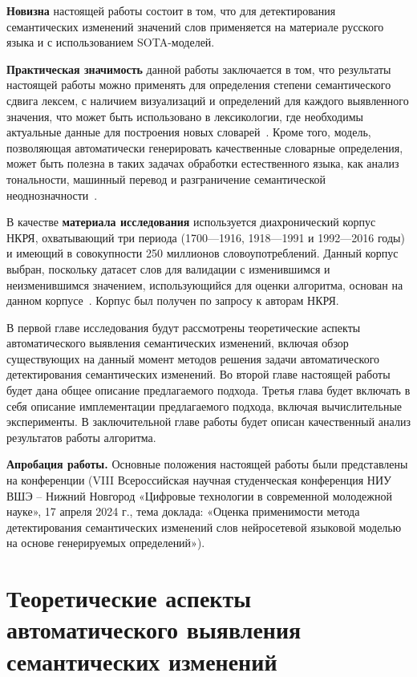 \documentclass[LI,VKR]{HSEUniversity}
\begin{document}
\textbf{Новизна} настоящей работы состоит в том, что для детектирования семантических изменений
значений слов применяется на материале русского языка и с использованием SOTA-моделей.

\textbf{Практическая значимость} данной работы заключается в том, что результаты настоящей работы
можно применять для определения степени семантического сдвига лексем, с наличием визуализаций и
определений для каждого выявленного значения, что может быть использовано в лексикологии,
где необходимы актуальные данные для построения новых словарей~\cite{DefinitionGenerationMainArticle}.
Кроме того, модель, позволяющая автоматически генерировать качественные словарные определения,
может быть полезна в таких задачах обработки естественного языка, как анализ тональности,
машинный перевод и разграничение семантической неоднозначности~\cite{DefinitionModelingReviewAndDatasetAnalysis}.

В качестве \textbf{материала исследования} используется диахронический корпус НКРЯ, охватывающий
три периода (1700—1916, 1918—1991 и 1992—2016 годы) и имеющий в совокупности 250 миллионов
словоупотреблений.
Данный корпус выбран, поскольку датасет слов для валидации с изменившимся и неизменившимся значением,
использующийся для оценки алгоритма, основан на данном корпусе~\cite{rushifteval}.
Корпус был получен по запросу к авторам НКРЯ.

В первой главе исследования будут рассмотрены теоретические аспекты автоматического выявления
семантических изменений, включая обзор существующих на данный момент методов
решения задачи автоматического детектирования семантических изменений.
Во второй главе настоящей работы будет дана общее описание предлагаемого подхода.
Третья глава будет включать в себя описание имплементации предлагаемого подхода,
включая вычислительные эксперименты.
В заключительной главе работы будет описан качественный анализ результатов работы
алгоритма.

\textbf{Апробация работы.}
Основные положения настоящей работы были представлены на конференции
(VIII Всероссийская научная студенческая конференция НИУ ВШЭ – Нижний Новгород
«Цифровые технологии в современной молодежной науке», 17 апреля 2024 г.,
тема доклада: «Оценка применимости метода детектирования семантических изменений слов нейросетевой
языковой моделью на основе генерируемых определений»).

\chapter{Теоретические аспекты автоматического выявления семантических изменений}
\end{document}
